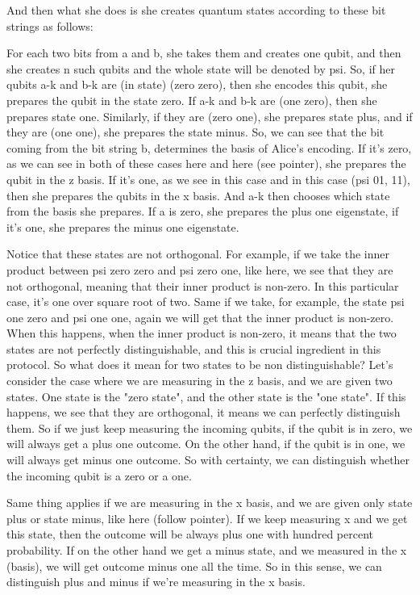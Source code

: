 And then what she does is she creates quantum states according to these bit strings as follows:

For each two bits from a and b, she takes them and creates one qubit, and then she creates n such qubits and the whole state will be denoted by psi. So, if her qubits a-k and b-k are (in state) (zero zero), then she encodes this qubit, she prepares the qubit in the state zero. If a-k and b-k are (one zero), then she prepares state one. Similarly, if they are (zero one), she prepares state plus, and if they are (one one), she prepares the state minus. So, we can see that the bit coming from the bit string b, determines the basis of Alice's encoding. If it's zero, as we can see in both of these cases here and here (see pointer), she prepares the qubit in the z basis. If it's one, as we see in this case and in this case (psi 01, 11), then she prepares the qubits in the x basis. And a-k then chooses which state from the basis she prepares. If a is zero, she prepares the plus one eigenstate, if it's one, she prepares the minus one eigenstate.

Notice that these states are not orthogonal. For example, if we take the inner product between psi zero zero and psi zero one, like here, we see that they are not orthogonal, meaning that their inner product is non-zero. In this particular case, it's one over square root of two. Same if we take, for example, the state psi one zero and psi one one, again we will get that the inner product is non-zero. When this happens, when the inner product is non-zero, it means that the two states are not perfectly distinguishable, and this is crucial ingredient in this protocol. So what does it mean for two states to be non distinguishable? Let's consider the case where we are measuring in the z basis, and we are given two states. One state is the "zero state", and the other state is the "one state". If this happens, we see that they are orthogonal, it means we can perfectly distinguish them. So if we just keep measuring the incoming qubits, if the qubit is in zero, we will always get a plus one outcome. On the other hand, if the qubit is in one, we will always get minus one outcome. So with certainty, we can distinguish whether the incoming qubit is a zero or a one.

Same thing applies if we are measuring in the x basis, and we are given only state plus or state minus, like here (follow pointer). If we keep measuring x and we get this state, then the outcome will be always plus one with hundred percent probability. If on the other hand we get a minus state, and we measured in the x (basis), we will get outcome minus one all the time. So in this sense, we can distinguish plus and minus if we're measuring in the x basis.

